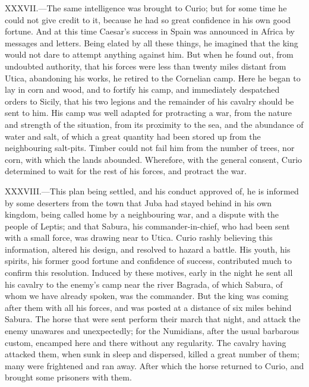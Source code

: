 XXXVII.—The same intelligence was brought to Curio; but for some time
he could not give credit to it, because he had so great confidence in
his own good fortune. And at this time Caesar's success in Spain was
announced in Africa by messages and letters. Being elated by all these
things, he imagined that the king would not dare to attempt anything
against him. But when he found out, from undoubted authority, that his
forces were less than twenty miles distant from Utica, abandoning his
works, he retired to the Cornelian camp. Here he began to lay in corn
and wood, and to fortify his camp, and immediately despatched orders to
Sicily, that his two legions and the remainder of his cavalry should be
sent to him. His camp was well adapted for protracting a war, from the
nature and strength of the situation, from its proximity to the sea, and
the abundance of water and salt, of which a great quantity had been
stored up from the neighbouring salt-pits. Timber could not fail him
from the number of trees, nor corn, with which the lands abounded.
Wherefore, with the general consent, Curio determined to wait for the
rest of his forces, and protract the war.

XXXVIII.—This plan being settled, and his conduct approved of, he is
informed by some deserters from the town that Juba had stayed behind in
his own kingdom, being called home by a neighbouring war, and a dispute
with the people of Leptis; and that Sabura, his commander-in-chief, who
had been sent with a small force, was drawing near to Utica. Curio
rashly believing this information, altered his design, and resolved to
hazard a battle. His youth, his spirits, his former good fortune and
confidence of success, contributed much to confirm this resolution.
Induced by these motives, early in the night he sent all his cavalry to
the enemy's camp near the river Bagrada, of which Sabura, of whom we
have already spoken, was the commander. But the king was coming after
them with all his forces, and was posted at a distance of six miles
behind Sabura. The horse that were sent perform their march that night,
and attack the enemy unawares and unexpectedly; for the Numidians, after
the usual barbarous custom, encamped here and there without any
regularity. The cavalry having attacked them, when sunk in sleep and
dispersed, killed a great number of them; many were frightened and ran
away. After which the horse returned to Curio, and brought some
prisoners with them.

